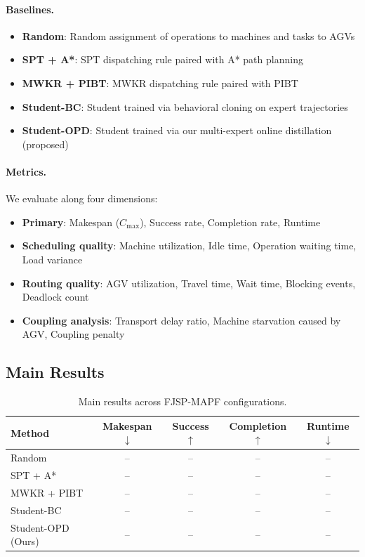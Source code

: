 \documentclass[11pt,a4paper]{article}
\begin{document}
\paragraph{Baselines.}
\begin{itemize}[leftmargin=*]
    \item \textbf{Random}: Random assignment of operations to machines and tasks to AGVs
    \item \textbf{SPT + A*}: SPT dispatching rule paired with A* path planning
    \item \textbf{MWKR + PIBT}: MWKR dispatching rule paired with PIBT
    \item \textbf{Student-BC}: Student trained via behavioral cloning on expert trajectories
    \item \textbf{Student-OPD}: Student trained via our multi-expert online distillation (proposed)
\end{itemize}

\paragraph{Metrics.}
We evaluate along four dimensions:
\begin{itemize}[leftmargin=*]
    \item \textbf{Primary}: Makespan ($C_{\max}$), Success rate, Completion rate, Runtime
    \item \textbf{Scheduling quality}: Machine utilization, Idle time, Operation waiting time, Load variance
    \item \textbf{Routing quality}: AGV utilization, Travel time, Wait time, Blocking events, Deadlock count
    \item \textbf{Coupling analysis}: Transport delay ratio, Machine starvation caused by AGV, Coupling penalty
\end{itemize}

\subsection{Main Results}

\begin{table}[htbp]
    \centering
    \caption{Main results across FJSP-MAPF configurations.}
    \label{tab:main}
    \begin{tabular}{lcccc}
        \toprule
        \textbf{Method} & \textbf{Makespan} $\downarrow$ & \textbf{Success} $\uparrow$ & \textbf{Completion} $\uparrow$ & \textbf{Runtime} $\downarrow$ \\
        \midrule
        Random           & -- & -- & -- & -- \\
        SPT + A*         & -- & -- & -- & -- \\
        MWKR + PIBT      & -- & -- & -- & -- \\
        Student-BC       & -- & -- & -- & -- \\
        Student-OPD (Ours) & -- & -- & -- & -- \\
        \bottomrule
    \end{tabular}
\end{table}
\end{document}
